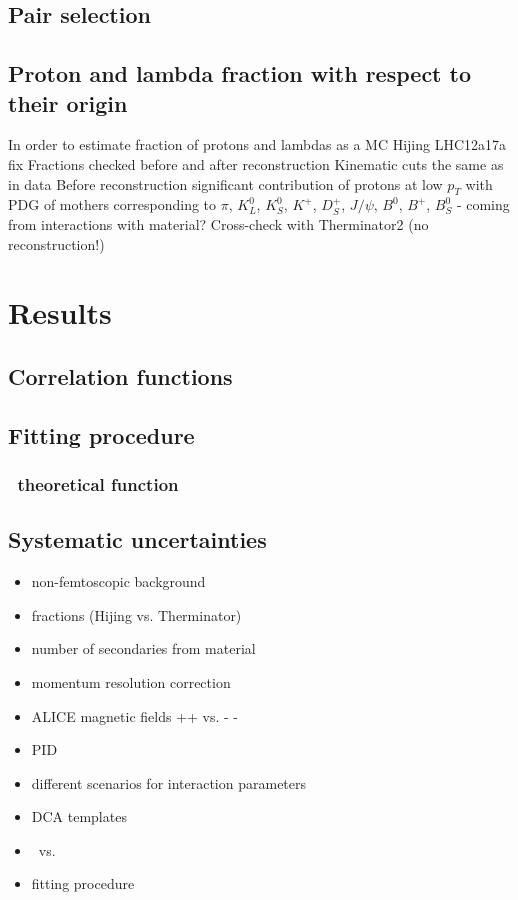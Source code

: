 \subsection{Pair selection}

\subsection{Proton and lambda fraction with respect to their origin}
In order to estimate fraction of protons and lambdas as a   MC Hijing LHC12a17a fix
 Fractions checked before and after reconstruction
 Kinematic cuts the same as in data
 Before reconstruction significant contribution of protons at low $p_{T}$  with PDG of mothers corresponding to $\pi$, $K^0_L$, $K^0_S$, $K^+$, $D^+_S$, $J/\psi$, $B^0$, $B^+$, $B^0_S$ - coming from interactions with material?
 Cross-check with Therminator2 (no reconstruction!)


\section{Results}

\subsection{Correlation functions}

\subsection{Fitting procedure}
\subsubsection{\pap~theoretical function}

\subsection{Systematic uncertainties}
\begin{itemize}
\item non-femtoscopic background
\item fractions (Hijing vs. Therminator)
\item number of secondaries from material
\item momentum resolution correction
\item ALICE magnetic fields ++ vs. - - 
\item PID
\item different scenarios for interaction parameters
\item DCA templates
\item \pal~vs.~\apl
\item fitting procedure    
\end{itemize}

